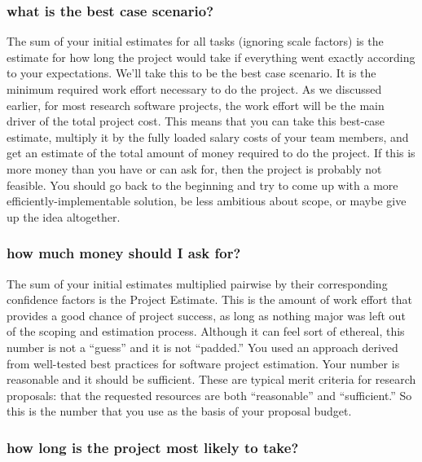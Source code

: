 \documentclass[12pt,oneside]{book}
\begin{document}
\subsubsection*{what is the best case scenario?}

The sum of your initial estimates for all tasks (ignoring scale factors) is the estimate for how long the project would take if everything went exactly according to your expectations. We'll take this to be the best case scenario. It is the minimum required work effort necessary to do the project. As we discussed earlier, for most research software projects, the work effort will be the main driver of the total project cost. This means that you can take this best-case estimate, multiply it by the fully loaded salary costs of your team members, and get an estimate of the total amount of money required to do the project. If this is more money than you have or can ask for, then the project is probably not feasible. You should go back to the beginning and try to come up with a more efficiently-implementable solution, be less ambitious about scope, or maybe give up the idea altogether.

\subsubsection*{how much money should I ask for?}

The sum of your initial estimates multiplied pairwise by their corresponding confidence factors is the Project Estimate. This is the amount of work effort that provides a good chance of project success, as long as nothing major was left out of the scoping and estimation process. Although it can feel sort of ethereal, this number is not a ``guess'' and it is not ``padded.'' You used an approach derived from well-tested best practices for software project estimation. Your number is reasonable and it should be sufficient. These are typical merit criteria for research proposals: that the requested resources are both ``reasonable'' and ``sufficient.'' So this is the number that you use as the basis of your proposal budget.

\subsubsection*{how long is the project most likely to take?}
\end{document}
